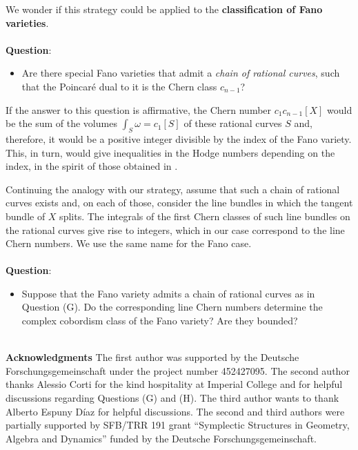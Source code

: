 \documentclass[12pt,a4paper]{amsart}
\theoremstyle{plain}
\theoremstyle{definition}
\begin{document}
We wonder if this strategy could be applied to the \textbf{classification of Fano varieties}. \\$\;$\\
\textbf{Question}:
\vspace{0.3cm}
\begin{itemize}
\item[(G)] Are there special Fano varieties that admit a \emph{chain of rational curves}, such that the Poincar\'e dual to it is the Chern class $c_{n-1}$?
\end{itemize}
\vspace{0.3cm}
If the answer to this question is affirmative, the Chern number $c_1c_{n-1}[X]$ would be the sum of the volumes $\int_{S}\omega=c_1[S]$ of these rational curves $S$ and, therefore, it would be a positive integer
divisible by the index of the Fano variety. This, in turn, would give inequalities in the Hodge numbers depending on the index, in the spirit of those obtained in \cite[Section 5.1]{MR3695881}. 

Continuing the analogy with our strategy, assume that such a chain of rational curves exists and, on each of those, consider the line bundles in which the tangent bundle of $X$ splits.
The integrals of the first Chern classes of such line bundles on the rational curves give rise to integers, which in our case correspond to the line Chern numbers. We use the same name for 
the Fano case.
\\$\;$\\
\textbf{Question}:
\vspace{0.3cm}
\begin{itemize}
\item[(H)] Suppose that the Fano variety admits a chain of rational curves as in Question (G). Do the
corresponding line Chern numbers determine the complex cobordism class of the Fano variety? 
Are they bounded? 
\end{itemize}
$\;$\\

\noindent\textbf{Acknowledgments} 
The first author was supported by the Deutsche Forschungsgemeinschaft under the project
number 452427095.
The second author thanks Alessio Corti for the kind
hospitality at Imperial College and for helpful discussions regarding Questions (G) and
(H). The third author wants to thank Alberto Espuny D\'iaz for helpful discussions.
 The second and third authors were partially supported by SFB/TRR 191 grant 
 ``Symplectic Structures in Geometry, Algebra and Dynamics'' funded by
the Deutsche Forschungsgemeinschaft.
\end{document}
